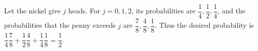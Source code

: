 Let the nickel give $j$ heads. For $j=0,1,2$, its probabilities are $\dfrac{1}{4},\dfrac{1}{2},\dfrac{1}{4}$, and the probabilities that the penny exceeds $j$ are $\dfrac{7}{8},\dfrac{4}{8},\dfrac{1}{8}$. Thus the desired probability is $\dfrac{1}{4}\dfrac{7}{8}+\dfrac{1}{2}\dfrac{4}{8}+\dfrac{1}{4}\dfrac{1}{8}=\boxed{\dfrac{1}{2}}$.
